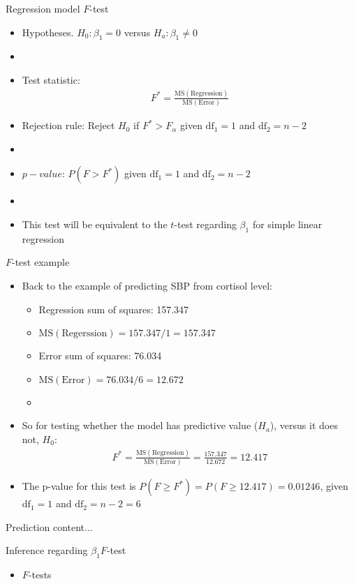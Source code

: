 \documentclass[xcolor=dvipsnames]{beamer}
\begin{document}
\begin{frame}{Regression model $F$-test}
	\begin{itemize}
		\item Hypotheses. $H_0: \beta_1 = 0$ versus $H_a: \beta_1 \neq 0$
		\item[]
		\item Test statistic:
		\begin{gather*}
		F^*= \frac{\text{MS}(\text{Regression})}{\text{MS}(\text{Error})}
		\end{gather*}
		\item Rejection rule: Reject $H_0$ if $F^*> F_{\alpha}$ given $\text{df}_1=1$ and $\text{df}_2=n-2$
		\item[]
		\item $p-value$: $P(F > F^*)$ given $\text{df}_1=1$ and $\text{df}_2=n-2$
		\item[]
		\item This test will be equivalent to the $t$-test regarding $\beta_1$ for simple linear regression
	\end{itemize}
\end{frame}

\begin{frame}{$F$-test example}
	\begin{itemize}
		\item Back to the example of predicting SBP from cortisol level:
		\begin{itemize}
			\item Regression sum of squares: 157.347
			\item $\text{MS}(\text{Regerssion}) = 157.347 / 1 = 157.347$
			\item Error sum of squares: 76.034
			\item $\text{MS}(\text{Error}) = 76.034 / 6 = 12.672$
			\item[]
		\end{itemize}
		\item So for testing whether the model has predictive value ($H_a$), versus it does not, $H_0$:
		\begin{gather*}
			F^*= \frac{\text{MS}(\text{Regression})}{\text{MS}(\text{Error})} = \frac{157.347}{12.672} = 12.417
		\end{gather*}
		\item The p-value for this test is $P(F \geq F^*) = P(F \geq 12.417) = 0.01246$,  given $\text{df}_1=1$ and $\text{df}_2=n-2 = 6$
	\end{itemize}
\end{frame}

\begin{frame}{Prediction}
	content...
\end{frame}

\begin{frame}{Inference regarding $\beta_1$}{$F$-test}
\begin{itemize}
	\item $F$-tests
\end{itemize}
\end{frame}
\end{document}

